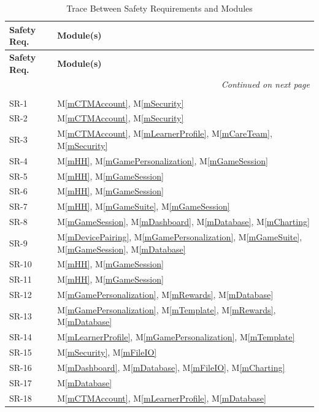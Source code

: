 \documentclass[12pt, titlepage]{article}
\newcommand{\mref}[1]{M\ref{#1}}
\begin{document}
\begin{longtable}{p{} p{}}
\toprule
\textbf{Safety Req.} & \textbf{Module(s)}\\
\midrule
\endfirsthead
\toprule
\textbf{Safety Req.} & \textbf{Module(s)}\\
\midrule
\endhead
\midrule
\multicolumn{2}{r}{\textit{Continued on next page}}\\
\endfoot
\bottomrule
\caption{Trace Between Safety Requirements and Modules}
\label{TblSafety}\\
\endlastfoot
SR-1 & \mref{mCTMAccount}, \mref{mSecurity}\\
SR-2 & \mref{mCTMAccount}, \mref{mSecurity}\\
SR-3 & \mref{mCTMAccount}, \mref{mLearnerProfile}, \mref{mCareTeam}, \mref{mSecurity}\\
SR-4 & \mref{mHH}, \mref{mGamePersonalization}, \mref{mGameSession}\\
SR-5 & \mref{mHH}, \mref{mGameSession}\\
SR-6 & \mref{mHH}, \mref{mGameSession}\\
SR-7 & \mref{mHH}, \mref{mGameSuite}, \mref{mGameSession}\\
SR-8 & \mref{mGameSession}, \mref{mDashboard}, \mref{mDatabase}, \mref{mCharting}\\
SR-9 & \mref{mDevicePairing}, \mref{mGamePersonalization}, \mref{mGameSuite}, \mref{mGameSession}, \mref{mDatabase}\\
SR-10 & \mref{mHH}, \mref{mGameSession}\\
SR-11 & \mref{mHH}, \mref{mGameSession}\\
SR-12 & \mref{mGamePersonalization}, \mref{mRewards}, \mref{mDatabase}\\
SR-13 & \mref{mGamePersonalization}, \mref{mTemplate}, \mref{mRewards}, \mref{mDatabase}\\
SR-14 & \mref{mLearnerProfile}, \mref{mGamePersonalization}, \mref{mTemplate}\\
SR-15 & \mref{mSecurity}, \mref{mFileIO}\\
SR-16 & \mref{mDashboard}, \mref{mDatabase}, \mref{mFileIO}, \mref{mCharting}\\
SR-17 & \mref{mDatabase}\\
SR-18 & \mref{mCTMAccount}, \mref{mLearnerProfile}, \mref{mDatabase}\\
\bottomrule
\end{longtable}
\renewcommand{\arraystretch}{1.0}
\end{document}
